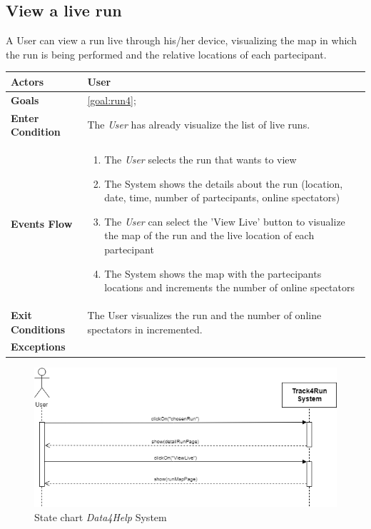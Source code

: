   \subsection{View a live run}
A User can view a run live through his/her device, visualizing the map in which the run is being performed and the relative locations of each partecipant.

\begin{table}[H]
	\centering
    
    \begin{tabular}{|p{3.5cm}|p{10.3cm}|}
    
    \hline
    \textbf{\large{Actors}}  			& \tabitem User 	\\
    				 					
    \hline
    \textbf{\large{Goals}} 				& \ref{goal:run4};\\
    
    \hline
    \textbf{\large{Enter Condition}}	& The \emph{User} has already visualize the list of live runs.		\\
    
    \hline
    \textbf{\large{Events Flow}}		& \begin{enumerate}[leftmargin=0.5cm]
                                          	\item The \emph{User}  selects the run that wants to view
                                            \item The System shows the details about the run (location, date, time, number of partecipants, online spectators)
                                             \item The \emph{User} can select the 'View Live' button to visualize the map of the run and the live location of each partecipant
                                            \item The System shows the map with the partecipants locations and increments the number of online spectators
                                           
                                          \end{enumerate}
    										\\
    \hline
    \textbf{\large{Exit Conditions}}    & The User visualizes the run and the number of online spectators in incremented.  \\
    
    \hline
    \textbf{\large{Exceptions}} 		& \\
    
    \hline
    
    
    \end{tabular}
	
\end{table}

\begin{figure}[H]
    \centering
    \includegraphics[scale=0.4]{Pictures/viewLiveRun.png}
    \caption{State chart  \emph{Data4Help} System}
\end{figure}
